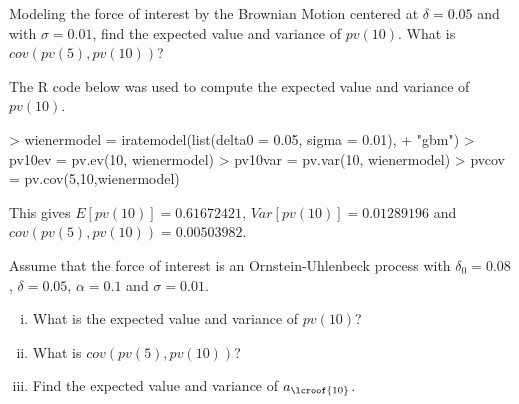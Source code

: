 \documentclass{article}
\numberwithin{questioncounter}{section}
\begin{document}
\begin{question}
Modeling the force of interest by the Brownian Motion centered at $\delta = 0.05$ and with $\sigma = 0.01$, find the expected value and variance of $pv(10)$. What is $cov(pv(5), pv(10))$?
\end{question}

\begin{solution}
The R code below was used to compute the expected value and variance of $pv(10)$.

\begin{Schunk}
\begin{Sinput}
> wienermodel = iratemodel(list(delta0 = 0.05, sigma = 0.01), 
+                          "gbm")
> pv10ev = pv.ev(10, wienermodel)
> pv10var = pv.var(10, wienermodel)
> pvcov = pv.cov(5,10,wienermodel)
\end{Sinput}
\end{Schunk}

This gives $E[pv(10)] = 0.61672421$, $Var[pv(10)] = 0.01289196$ and $cov(pv(5), pv(10)) = 0.00503982$.

\end{solution}

\begin{question}
Assume that the force of interest is an Ornstein-Uhlenbeck process with $\delta_{0} = 0.08$, $\delta = 0.05$, $\alpha = 0.1$ and $\sigma = 0.01$.

\begin{enumerate}[(i)]
\item What is the expected value and variance of $pv(10)$?
\item What is $cov(pv(5), pv(10))$?
\item Find the expected value and variance of $a_{\lcroof{10}}$.
\end{enumerate}

\end{question}
\end{document}
